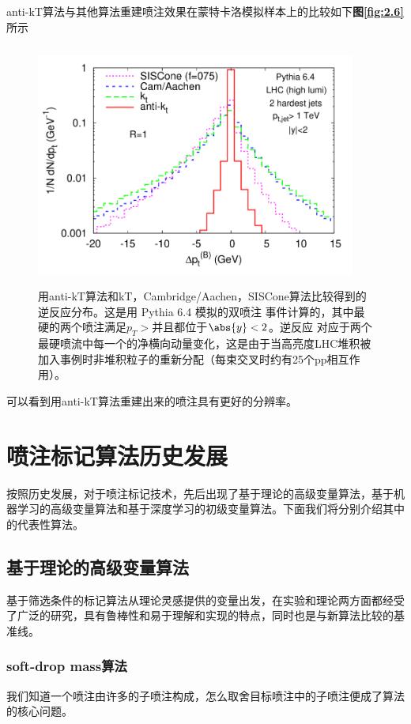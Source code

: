 anti-kT算法与其他算法重建喷注效果在蒙特卡洛模拟样本上的比较如下\textbf{图\ref{fig:2.6}}所示
\begin{figure}[H]
 \centering
 \includegraphics[height=8cm, width=10.5cm]{pictures/anti-kt.png}
 \caption{用anti-kT算法和kT，Cambridge/Aachen，SISCone算法比较得到的逆反应分布。这是用 Pythia 6.4 模拟的双喷注 事件计算的，其中最硬的两个喷注满足$p_T>$并且都位于$\abs{y}<2$。逆反应
对应于两个最硬喷流中每一个的净横向动量变化，这是由于当高亮度LHC堆积被加入事例时非堆积粒子的重新分配（每束交叉时约有25个pp相互作用）。\cite{The_anti-kt_jet_clustering_algorithm}}
 \label{fig:3.6}
\end{figure}
可以看到用anti-kT算法重建出来的喷注具有更好的分辨率。

\section{喷注标记算法历史发展\cite{jet-tagging-algorithms}}
按照历史发展，对于喷注标记技术，先后出现了基于理论的高级变量算法，基于机器学习的高级变量算法和基于深度学习的初级变量算法\cite{jet-tagging-algorithms}。下面我们将分别介绍其中的代表性算法。
\subsection{基于理论的高级变量算法}
基于筛选条件的标记算法从理论灵感提供的变量出发，在实验和理论两方面都经受了广泛的研究，具有鲁棒性和易于理解和实现的特点，同时也是与新算法比较的基准线。
\subsubsection{soft-drop mass算法}
我们知道一个喷注由许多的子喷注构成，怎么取舍目标喷注中的子喷注便成了算法的核心问题。

